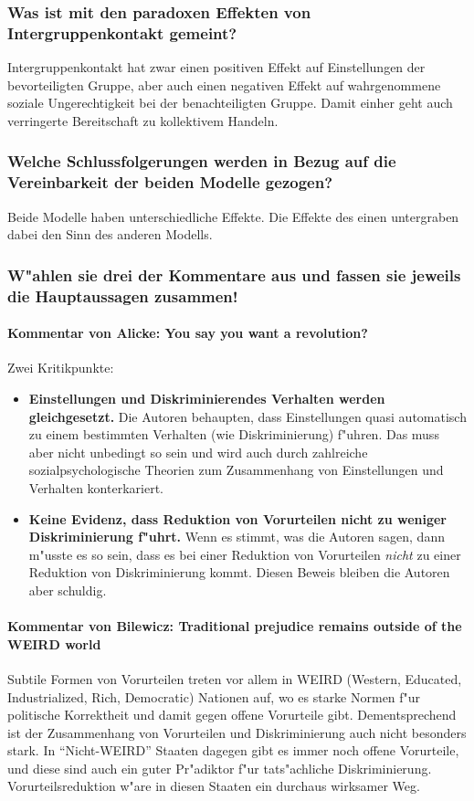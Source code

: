 \subsubsection{Was ist mit den paradoxen Effekten von Intergruppenkontakt gemeint?}
Intergruppenkontakt hat zwar einen positiven Effekt auf Einstellungen der bevorteiligten Gruppe, aber auch einen negativen Effekt auf wahrgenommene soziale Ungerechtigkeit bei der benachteiligten Gruppe. Damit einher geht auch verringerte Bereitschaft zu kollektivem Handeln.

\subsubsection{Welche Schlussfolgerungen werden in Bezug auf die Vereinbarkeit der beiden Modelle gezogen?}
Beide Modelle haben unterschiedliche Effekte. Die Effekte des einen untergraben dabei den Sinn des anderen Modells.

\subsubsection{W"ahlen sie drei der Kommentare aus und fassen sie jeweils die Hauptaussagen zusammen!}
\paragraph{Kommentar von Alicke: You say you want a revolution?}
Zwei Kritikpunkte:\\
\begin{itemize}
        \item \textbf{Einstellungen und Diskriminierendes Verhalten werden gleichgesetzt.} Die Autoren behaupten, dass Einstellungen quasi automatisch zu einem bestimmten Verhalten (wie Diskriminierung) f"uhren. Das muss aber nicht unbedingt so sein und wird auch durch zahlreiche sozialpsychologische Theorien zum Zusammenhang von Einstellungen und Verhalten konterkariert.
        \item \textbf{Keine Evidenz, dass Reduktion von Vorurteilen nicht zu weniger Diskriminierung f"uhrt.} Wenn es stimmt, was die Autoren sagen, dann m"usste es so sein, dass es bei einer Reduktion von Vorurteilen \emph{nicht} zu einer Reduktion von Diskriminierung kommt. Diesen Beweis bleiben die Autoren aber schuldig.
\end{itemize}

\paragraph{Kommentar von Bilewicz: Traditional prejudice remains outside of the WEIRD world}
Subtile Formen von Vorurteilen treten vor allem in WEIRD (Western, Educated, Industrialized, Rich, Democratic) Nationen auf, wo es starke Normen f"ur politische Korrektheit und damit gegen offene Vorurteile gibt. Dementsprechend ist der Zusammenhang von Vorurteilen und Diskriminierung auch nicht besonders stark. In ``Nicht-WEIRD'' Staaten dagegen gibt es immer noch offene Vorurteile, und diese sind auch ein guter Pr"adiktor f"ur tats"achliche Diskriminierung. Vorurteilsreduktion w"are in diesen Staaten ein durchaus wirksamer Weg.


